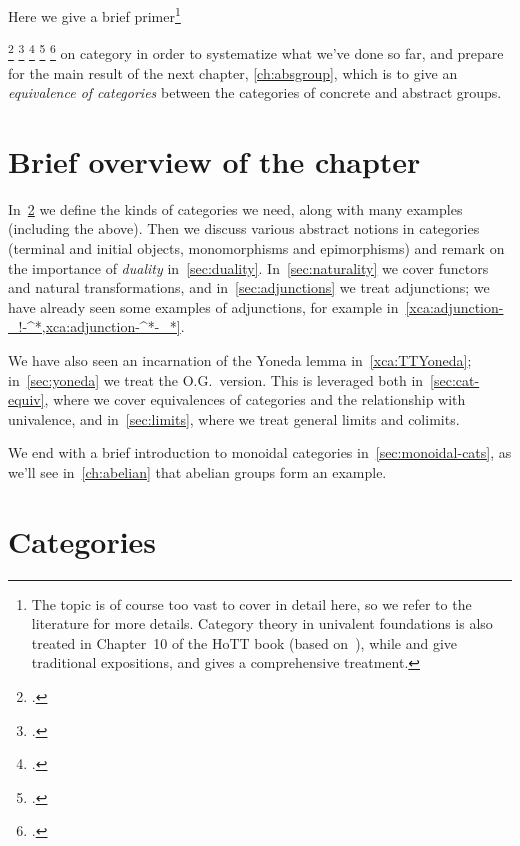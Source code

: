 Here we give a brief primer\footnote{%
  The topic is of course too vast to cover in detail here,
  so we refer to the literature for more details.
  Category theory in univalent foundations is also treated in
  Chapter~10 of the HoTT book\footnotemark{}
  (based on~\citeauthor{AKS2015}\footnotemark{}),
  while \citeauthor{AwodeyCat}\footnotemark{}
  and \citeauthor{RiehlContext}\footnotemark{}
  give traditional expositions,
  and \citeauthor{MacLaneWorking}\footnotemark{}
  gives a comprehensive treatment.}%
\addtocounter{footnote}{-3}\footcitetext{hottbook}%
\footcitetext{AKS2015}%
\footcitetext{AwodeyCat}%
\footcitetext{RiehlContext}%
\footcitetext{MacLaneWorking}%
on category in order to systematize what we've done so far,
and prepare for the main result of the next chapter,
\cref{ch:absgroup}, which is to give an
\emph{equivalence of categories} between the categories of concrete and abstract groups.

\section{Brief overview of the chapter}

In~\cref{sec:categories} we define the kinds of categories we need, along with many examples (including the above).
Then we discuss various abstract notions in categories
(terminal and initial objects, monomorphisms and epimorphisms)
and remark on the importance of \emph{duality} in~\cref{sec:duality}.
In~\cref{sec:naturality} we cover functors and natural transformations,
and in~\cref{sec:adjunctions} we treat adjunctions;
we have already seen some examples of adjunctions,
for example in~\cref{xca:adjunction-_!-^*,xca:adjunction-^*-_*}.

We have also seen an incarnation of the Yoneda lemma in~\cref{xca:TTYoneda};
in~\cref{sec:yoneda} we treat the O.G.\ version.
This is leveraged both in~\cref{sec:cat-equiv},
where we cover equivalences of categories
and the relationship with univalence,
and in~\cref{sec:limits}, where we treat general limits and colimits.

We end with a brief introduction to monoidal categories in~\cref{sec:monoidal-cats}, as we'll see in~\cref{ch:abelian} that abelian groups form an example.

\section{Categories}
\label{sec:categories}

